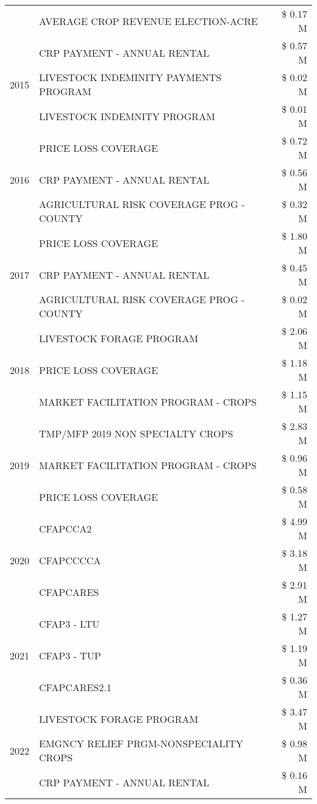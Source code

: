 \begin{tabular}{llr}
 & AVERAGE CROP REVENUE ELECTION-ACRE & \$ 0.17 M \\
\cline{1-3}
\multirow[t]{3}{*}{2015} & CRP PAYMENT - ANNUAL RENTAL & \$ 0.57 M \\
 & LIVESTOCK INDEMINITY PAYMENTS PROGRAM & \$ 0.02 M \\
 & LIVESTOCK INDEMNITY PROGRAM & \$ 0.01 M \\
\cline{1-3}
\multirow[t]{3}{*}{2016} & PRICE LOSS COVERAGE & \$ 0.72 M \\
 & CRP PAYMENT - ANNUAL RENTAL & \$ 0.56 M \\
 & AGRICULTURAL RISK COVERAGE PROG - COUNTY & \$ 0.32 M \\
\cline{1-3}
\multirow[t]{3}{*}{2017} & PRICE LOSS COVERAGE & \$ 1.80 M \\
 & CRP PAYMENT - ANNUAL RENTAL & \$ 0.45 M \\
 & AGRICULTURAL RISK COVERAGE PROG - COUNTY & \$ 0.02 M \\
\cline{1-3}
\multirow[t]{3}{*}{2018} & LIVESTOCK FORAGE PROGRAM & \$ 2.06 M \\
 & PRICE LOSS COVERAGE & \$ 1.18 M \\
 & MARKET FACILITATION PROGRAM - CROPS & \$ 1.15 M \\
\cline{1-3}
\multirow[t]{3}{*}{2019} & TMP/MFP 2019 NON SPECIALTY CROPS & \$ 2.83 M \\
 & MARKET FACILITATION PROGRAM - CROPS & \$ 0.96 M \\
 & PRICE LOSS COVERAGE & \$ 0.58 M \\
\cline{1-3}
\multirow[t]{3}{*}{2020} & CFAPCCA2 & \$ 4.99 M \\
 & CFAPCCCCA & \$ 3.18 M \\
 & CFAPCARES & \$ 2.91 M \\
\cline{1-3}
\multirow[t]{3}{*}{2021} & CFAP3 - LTU & \$ 1.27 M \\
 & CFAP3 - TUP & \$ 1.19 M \\
 & CFAPCARES2.1 & \$ 0.36 M \\
\cline{1-3}
\multirow[t]{3}{*}{2022} & LIVESTOCK FORAGE PROGRAM & \$ 3.47 M \\
 & EMGNCY RELIEF PRGM-NONSPECIALITY CROPS & \$ 0.98 M \\
 & CRP PAYMENT - ANNUAL RENTAL & \$ 0.16 M \\
\cline{1-3}
\bottomrule
\end{tabular}
